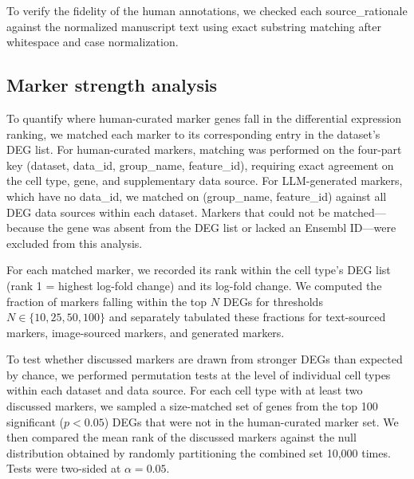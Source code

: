 \documentclass[10pt,twocolumn]{article}
\theoremstyle{plain}
\theoremstyle{definition}
\theoremstyle{remark}
\begin{document}
To verify the fidelity of the human annotations, we checked each source\_rationale against the normalized manuscript text using exact substring matching after whitespace and case normalization. 

\subsection{Marker strength analysis}

To quantify where human-curated marker genes fall in the differential expression ranking, we matched each marker to its corresponding entry in the dataset's DEG list. For human-curated markers, matching was performed on the four-part key (dataset, data\_id, group\_name, feature\_id), requiring exact agreement on the cell type, gene, and supplementary data source. For LLM-generated markers, which have no data\_id, we matched on (group\_name, feature\_id) against all DEG data sources within each dataset. Markers that could not be matched---because the gene was absent from the DEG list or lacked an Ensembl ID---were excluded from this analysis.

For each matched marker, we recorded its rank within the cell type's DEG list (rank 1 = highest log-fold change) and its log-fold change. We computed the fraction of markers falling within the top $N$ DEGs for thresholds $N \in \{10, 25, 50, 100\}$ and separately tabulated these fractions for text-sourced markers, image-sourced markers, and generated markers.

To test whether discussed markers are drawn from stronger DEGs than expected by chance, we performed permutation tests at the level of individual cell types within each dataset and data source. For each cell type with at least two discussed markers, we sampled a size-matched set of genes from the top 100 significant ($p < 0.05$) DEGs that were not in the human-curated marker set. We then compared the mean rank of the discussed markers against the null distribution obtained by randomly partitioning the combined set 10{,}000 times. Tests were two-sided at $\alpha = 0.05$.
\end{document}

